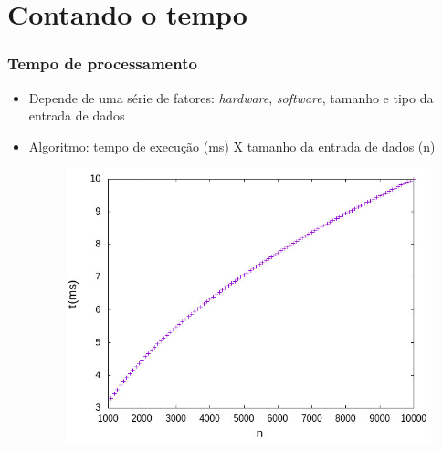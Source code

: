 \documentclass[aspectratio=169]{beamer}
\begin{document}
\section{Contando o tempo}

\begin{frame}\frametitle{Tempo de processamento}
\begin{itemize}
	\item Depende de uma série de fatores: \emph{hardware}, \emph{software}, tamanho e tipo da entrada de dados
	\item Algoritmo: tempo de execução (ms) X tamanho da entrada de dados (n)
	\begin{figure}[h]
		\centering
		\includegraphics[height=0.6\paperheight]{pucrs-ec-poo-unidade_01-complexidade_de_algoritmos-laminas-grafico.jpg}
	\end{figure}
\end{itemize}
\end{frame}
\end{document}
